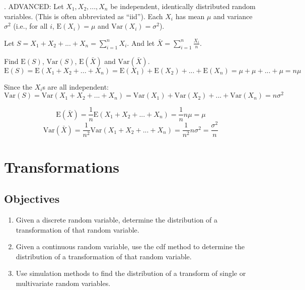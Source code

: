 \documentclass[
]{book}
\providecommand{\tightlist}{%
  \setlength{\itemsep}{0pt}\setlength{\parskip}{0pt}}
\begin{document}
. ADVANCED: Let \(X_1,X_2,...,X_n\) be independent, identically distributed random variables. (This is often abbreviated as ``iid''). Each \(X_i\) has mean \(\mu\) and variance \(\sigma^2\) (i.e., for all \(i\), \(\mbox{E}(X_i)=\mu\) and \(\mbox{Var}(X_i)=\sigma^2\)).

Let \(S=X_1+X_2+...+X_n=\sum_{i=1}^n X_i\). And let \(\bar{X}={\sum_{i=1}^n \frac{X_i}{n}}\).

Find \(\mbox{E}(S)\), \(\mbox{Var}(S)\), \(\mbox{E}(\bar{X})\) and \(\mbox{Var}(\bar{X})\).
\[
\mbox{E}(S)=\mbox{E}(X_1+X_2+...+X_n)=\mbox{E}(X_1)+\mbox{E}(X_2)+...+\mbox{E}(X_n)=\mu+\mu+...+\mu=n\mu
\]

Since the \(X_i\)s are all independent:
\[
\mbox{Var}(S)=\mbox{Var}(X_1+X_2+...+X_n)=\mbox{Var}(X_1)+\mbox{Var}(X_2)+...+\mbox{Var}(X_n)=n\sigma^2
\]

\[
\mbox{E}(\bar{X})=\frac{1}{n}\mbox{E}(X_1+X_2+...+X_n)=\frac{1}{n}n\mu=\mu
\]
\[
\mbox{Var}(\bar{X})=\frac{1}{n^2}\mbox{Var}(X_1+X_2+...+X_n)=\frac{1}{n^2}n\sigma^2=\frac{\sigma^2}{n}
\]

\hypertarget{TRANS}{%
\chapter{Transformations}\label{TRANS}}

\newcommand{\E}{\mbox{E}}
\newcommand{\Var}{\mbox{Var}}
\newcommand{\Cov}{\mbox{Cov}}
\newcommand{\Prob}{\mbox{P}}
\newcommand{\diff}{\,\mathrm{d}}

\hypertarget{objectives-15}{%
\section{Objectives}\label{objectives-15}}

\begin{enumerate}
\def\labelenumi{\arabic{enumi})}
\tightlist
\item
  Given a discrete random variable, determine the distribution of a transformation of that random variable.\\
\item
  Given a continuous random variable, use the cdf method to determine the distribution of a transformation of that random variable.\\
\item
  Use simulation methods to find the distribution of a transform of single or multivariate random variables.
\end{enumerate}
\end{document}
